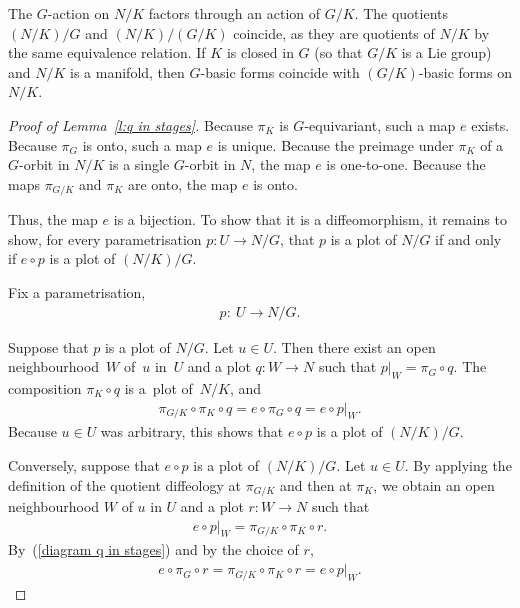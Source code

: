 \documentclass[pdftex]{sigma}
\numberwithin{equation}{section}
\begin{document}
\begin{Remark} \label{r:splits}
The $G$-action on $N/K$ factors through an action of $G/K$.
The quotients $(N/K)/G$ and $(N/K)/(G/K)$ coincide,
as they are quotients of $N/K$ by the same equivalence relation.
If $K$ is closed in $G$ (so that $G/K$ is a Lie group)
and $N/K$ is a manifold, then $G$-basic forms coincide with $(G/K)$-basic forms
on $N/K$.
\end{Remark}


\begin{proof}[Proof of Lemma~\ref{l:q in stages}]
Because $\pi_K$ is $G$-equivariant, such a map $e$ exists.
Because $\pi_G$ is onto, such a map $e$ is unique.
Because the preimage under $\pi_K$ of a $G$-orbit in $N/K$
is a single $G$-orbit in $N$, the map $e$ is one-to-one.
Because the maps $\pi_{G/K}$ and $\pi_K$ are onto,
the map $e$ is onto.

Thus, the map $e$ is a bijection. To show that it is a dif\/feomorphism,
it remains to show,
for every parametrisation $p \colon U \to N/G$,
that $p$ is a plot of $N/G$ if and only if $e \circ p$ is a plot of $(N/K)/G$.

Fix a parametrisation,
\begin{gather*} p \colon \ U \to N/G.\end{gather*}

Suppose that $p$ is a plot of $N/G$. Let $u \in U$.
Then there exist an open neighbourhood~$W$ of~$u$ in~$U$
and a plot $q \colon W \to N$ such that $p|_W = \pi_G \circ q$.
The composition $\pi_K \circ q$ is a~plot of~$N/K$, and
\begin{gather*} \pi_{G/K} \circ \pi_K \circ q = e \circ \pi_G \circ q = e \circ p|_W.\end{gather*}
Because $u \in U$ was arbitrary,
this shows that $e \circ p$ is a plot of $(N/K)/G$.

Conversely, suppose that $e \circ p$ is a plot of $(N/K)/G$.
Let $u \in U$. By applying the def\/inition of the quotient dif\/feology
at $\pi_{G/K}$ and then at $\pi_K$,
we obtain an open neighbourhood $W$ of $u$ in $U$
and a plot $r \colon W \to N$ such that
\begin{gather*} e \circ p|_W = \pi_{G/K} \circ \pi_K \circ r .\end{gather*}
By~(\ref{diagram q in stages}) and by the choice of $r$,
\begin{gather*}e \circ \pi_G \circ r = \pi_{G/K} \circ \pi_K \circ r = e \circ p|_W.\end{gather*}


\end{proof}
\end{document}
